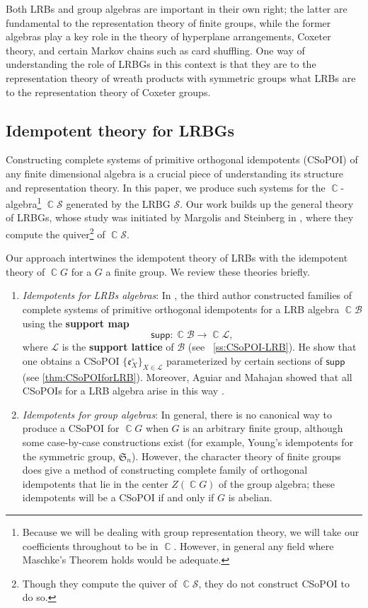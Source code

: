 \documentclass[11pt, oneside, reqno]{amsart}
\theoremstyle{definition}
\numberwithin{equation}{section}
\DeclareMathOperator{\C}{\mathbb{C}}
\newcommand{\defn}[1]{{\color{RoyalBlue}\bf#1}}
\def \BB{{\mathcal{B}}}
\def \SS{{\mathcal{S}}}
\def \kk{\C}
\def \lat{{\mathcal{L}}}
\def \sym{\mathfrak{S}}
\def \ee{{\mathfrak{e}}}
\def \supp{\mathsf{supp}}
\begin{document}
Both LRBs and group algebras are important in their own right; the latter are fundamental to the representation theory of finite groups, while the former algebras play a key role in the theory of hyperplane arrangements, Coxeter theory, and certain Markov chains such as card shuffling. One way of understanding the role of LRBGs in this context is that they are to the representation theory of wreath products with symmetric groups what LRBs are to the representation theory of Coxeter groups. 

\subsection*{Idempotent theory for LRBGs}
Constructing complete systems of primitive orthogonal idempotents (CSoPOI) of any finite dimensional algebra is a crucial piece of understanding its structure and representation theory. 
In this paper, we produce such systems for the $\kk$-algebra\footnote{Because we will be dealing with group representation theory, we will take our coefficients throughout to be in $\C$. However, in general any field where Maschke's Theorem holds would be adequate.} $\kk \SS$ generated by the LRBG $\SS$. Our work builds up the general theory of LRBGs, whose study was initiated by Margolis and Steinberg in \cite{ms11HomologySemigroups}, where they compute the quiver\footnote{Though they compute the quiver of $\kk \SS$, they do not construct CSoPOI to do so.} of $\kk \SS$.


Our approach intertwines the idempotent theory of LRBs with the idempotent theory of $\kk G$ for a $G$ a finite group.  We review these theories briefly.
\begin{enumerate}
\item \emph{Idempotents for LRBs algebras}: In \cite{saliola07quiverLRB, sal2008quiv, saliola2009face, saliola2012eigenvectors}, the third author constructed families of complete systems of primitive orthogonal idempotents for a LRB algebra $\kk \BB$ using the \defn{support map} 
\[ \supp: \kk \BB \longrightarrow \kk \lat,\]
where $\lat$ is the \defn{support lattice} of $\BB$ (see \ \cref{ss:CSoPOI-LRB}).
He show that one obtains a CSoPOI $\{\ee^\circ_{X}\}_{X \in \lat}$
parameterized by certain sections of $\supp$ (see \cref{thm:CSoPOIforLRB}).
Moreover, Aguiar and Mahajan showed that all CSoPOIs for
a LRB algebra arise in this way \cite[Prop. 11.9]{am17}.

    \item \emph{Idempotents for group algebras}:
In general, there is no canonical way to produce a CSoPOI for $\kk G$ when $G$ is an arbitrary finite group, although some case-by-case constructions exist (for example, Young's idempotents for the symmetric group, $\sym_n$). However, the character theory of finite groups does give a method of constructing complete family of orthogonal idempotents that lie in the center $Z(\kk G)$ of the group algebra; these idempotents will be a CSoPOI if and only if $G$ is abelian.

    
\end{enumerate}
\end{document}
